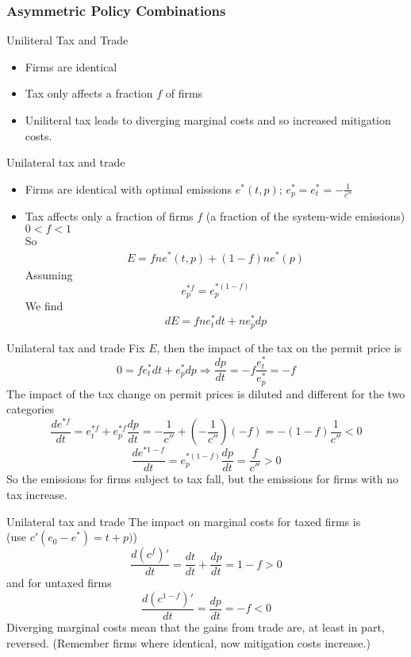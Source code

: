 \subsubsection{Asymmetric Policy Combinations}

{Uniliteral Tax and Trade}
\begin{itemize}
\item<1-> Firms are identical
\item<2-> Tax only affects a fraction $f$ of firms
\item<3-> Uniliteral tax leads to diverging marginal costs and so increased mitigation costs.
\end{itemize}




{Unilateral tax and trade}
\begin{itemize}
\item <1-> Firms are identical with optimal emissions $e^*(t,p)$; $e^*_p = e^*_t = -\frac{1}{c''}$
\item <2-> Tax affects only a fraction of firms $f$ (a fraction of the system-wide emissions) $0 < f < 1$ \\
 So
\begin{align}
E = fne^*(t,p)+(1-f)ne^*(p)
\end{align}
Assuming
\[
e^{*f}_p = e^{*(1-f)}_p
\]
We find
\[
dE = fne^*_tdt+ne^*_pdp
\]
\end{itemize}





{Unilateral tax and trade}
Fix $E$, then the impact of the tax on the permit price is
\[
0 =  fe^*_tdt+e^*_pdp \Rightarrow \frac{dp}{dt} = -f \frac{e^*_t}{e^*_p} = -f
\]
The impact of the tax change on permit prices is diluted and different for the two categories
\[
\frac{de^{*f}}{dt} = e^{*f}_t + e^{*f}_p \frac{dp}{dt} = -\frac{1}{c''} + (-\frac{1}{c''})(-f) = -(1-f)\frac{1}{c''} < 0
\]
\[
\frac{de^{*1-f}}{dt} = e^{*(1-f)}_p\frac{dp}{dt} = \frac{f}{c''} > 0
\]
So the emissions for firms subject to tax fall, but the emissions for firms with no tax increase.





{Unilateral tax and trade}
The impact on marginal costs for taxed firms is \\
(use $c'(e_0-e^*) = t+p)$)
\[
\frac{d(c^f)'}{dt} = \frac{dt}{dt} + \frac{dp}{dt} = 1-f > 0
\]
and for untaxed firms
\[
\frac{d(c^{1-f})'}{dt} = \frac{dp}{dt} = -f < 0
\]
Diverging marginal costs mean that the gains from trade are, at least in part, reversed. (Remember firms where identical, now mitigation costs increase.)


